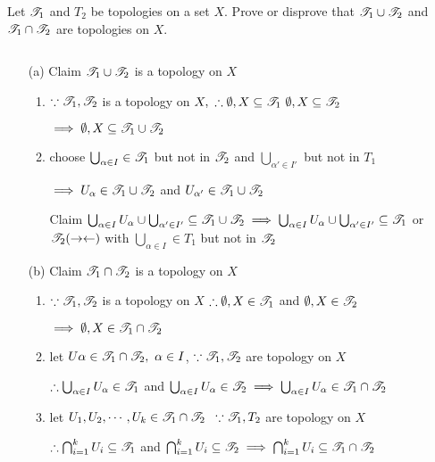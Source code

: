 Let $\mathscr{T}_1$ and $T_2$ be topologies on a set $X$. Prove or disprove that $\mathscr{T}_1 \cup \mathscr{T}_2$ and $\mathscr{T}_1 \cap \mathscr{T}_2$ are topologies on $X$.

\begin{tcolorbox}
	\begin{solution}$ $
	
	\begin{enumerate}[wide]
		\item[(a)] Claim $\mathscr{T}_1 \cup \mathscr{T}_2$ is a topology on $X$
		\begin{enumerate}[label = $\roman*$)]
			\item $\because \mathscr{T}_1, \mathscr{T}_2$ is a topology on $X,~ \therefore \emptyset,X \subseteq \mathscr{T}_1 ~ \emptyset, X \subseteq \mathscr{T}_2$
			
			$\implies \emptyset , X \subseteq \mathscr{T}_1 \cup \mathscr{T}_2$
			\item choose $\bigcup_{\alpha \in I} \in \mathscr{T}_1$ but not in $\mathscr{T}_2$ and $\bigcup_{\alpha' \in I'}$ but not in $T_1$
			
			$\implies U_\alpha \in \mathscr{T}_1 \cup \mathscr{T}_2$ and $U_{\alpha'} \in \mathscr{T}_1 \cup \mathscr{T}_2$
			
			Claim $\bigcup_{\alpha \in I}U_{\alpha} \cup \bigcup_{\alpha' \in I'} \subseteq \mathscr{T}_1 \cup \mathscr{T}_2 \implies \bigcup_{\alpha \in I}U_{\alpha} \cup \bigcup_{\alpha' \in I'} \subseteq \mathscr{T}_1$ or $\mathscr{T}_2 (\rightarrow \leftarrow)$ with $\bigcup_{\alpha \in I} \in T_1$ but not in $\mathscr{T}_2$
		\end{enumerate}
		
		\item[(b)]  Claim $\mathscr{T}_1 \cap \mathscr{T}_2$ is a topology on $X$
			\begin{enumerate}[label = $\roman*$)]
				\item $\because \mathscr{T}_1,\mathscr{T}_2$ is a topology on $X$ $\therefore \emptyset,X \in \mathscr{T}_1$ and $\emptyset,X \in \mathscr{T}_2 $
				
				$\implies \emptyset , X \in \mathscr{T}_1 \cap \mathscr{T}_2$
				\item let $U{\alpha} \in \mathscr{T}_1 \cap \mathscr{T}_2,~ \alpha \in I$, $\because \mathscr{T}_1,\mathscr{T}_2$ are topology on $X$
				
				$\therefore \bigcup_{\alpha \in I}U_{\alpha} \in \mathscr{T}_1$ and $\bigcup_{\alpha \in I}U_{\alpha} \in \mathscr{T}_2 \implies \bigcup_{\alpha \in I}U_{\alpha} \in \mathscr{T}_1 \cap \mathscr{T}_2$
				\item let $U_1 , U_2,\cdots , U_k \in \mathscr{T}_1 \cap \mathscr{T}_2$ $~\because \mathscr{T}_1,T_2$ are topology on $X$
				
				$\therefore \bigcap_{i = 1}^{k}U_i \subseteq \mathscr{T}_1$ and $\bigcap_{i = 1}^{k}U_i \subseteq \mathscr{T}_2 \implies \bigcap^{k}_{i = 1}U_i \subseteq \mathscr{T}_1 \cap \mathscr{T}_2$
			\end{enumerate}
	\end{enumerate}
		
	\end{solution}
\end{tcolorbox}

